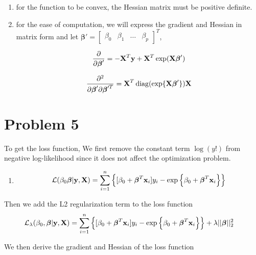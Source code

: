 \documentclass{article}
\newcommand{\vect}[1]{\boldsymbol{#1}}
\newcommand{\vectrm}[1]{\boldsymbol{\rm #1}}
\DeclareMathOperator{\diag}{diag}
\begin{document}
\begin{enumerate}[label=(\alph*)]
\item for the function to be convex, the Hessian matrix must be positive definite.

\item for the ease of computation, we will express the gradient and Hessian in matrix form and let \(\vect \beta' = \begin{bmatrix}
    \beta_0 & \beta_1 & \ldots & \beta_p
\end{bmatrix}^T\),

\[\frac{\partial}{\partial \vect \beta'} = -\vectrm X^T \vectrm y
+ \vectrm X^T \exp(\vectrm X \vect \beta')
\]

\[\frac{\partial^2}{\partial \vect \beta' \partial \vect \beta'^T} = \vectrm X^T \diag(\exp \{\vectrm X \vect \beta'\}) \vectrm X\]
\end{enumerate}

\section*{Problem 5}
To get the loss function, We first remove the constant term \(\log(y!)\) from negative log-likelihood since it does not affect the optimization problem.
\begin{enumerate}[label=(\alph*)]
  \item 
  \begin{align*}
       \mathcal L(\beta_0 \vect \beta | \vectrm y, \vectrm X) &= \sum_{i=1}^{n} \left\{ [\beta_0 + \vect{\beta}^T \vectrm{x}_i]y_i -
            \exp\left\{\beta_0 + \vect{\beta}^T \vectrm{x}_i\right\}
            \right\} \\
  \end{align*}
\end{enumerate}
Then we add the L2 regularization term to the loss function
  \begin{align*}
       \mathcal L_\lambda(\beta_0, \vect \beta | \vectrm y, \vectrm X) &= \sum_{i=1}^{n} \left\{ [\beta_0 + \vect{\beta}^T \vectrm{x}_i]y_i -
            \exp\left\{\beta_0 + \vect{\beta}^T \vectrm{x}_i\right\}
            \right\} + \lambda ||\vect \beta||_2^2
  \end{align*}

  We then derive the gradient and Hessian of the loss function
\end{document}
